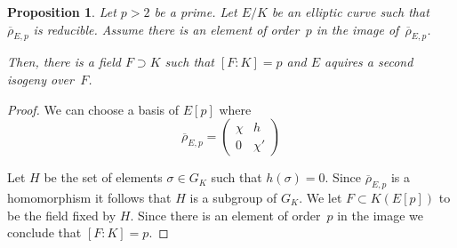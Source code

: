 \documentclass[12pt]{amsart}
\newcommand{\rhobar}{{\overline{\rho}}}
\numberwithin{equation}{section}
\newtheorem{proposition}[theorem]{Proposition}
\theoremstyle{definition}
\theoremstyle{remark}
\begin{document}
\begin{proposition} \label{P:fieldF}
Let $p > 2$ be a prime. Let $E/K$ be an elliptic curve such that 
$\rhobar_{E,p}$ is reducible. Assume there is an element of order~$p$ 
in the image of~$\rhobar_{E,p}$. 

Then, there is a field $F \supset K$ such that $[F : K] = p$ and $E$ aquires a 
second isogeny over~$F$.
\end{proposition}
\begin{proof} We can choose a basis of $E[p]$ where
\[
\rhobar_{E,p} =  \begin{pmatrix}
                            \chi& h \\
                            0 & \chi'
                            \end{pmatrix} \]

Let $H$ be the set of elements $\sigma \in  G_K$ such 
that $h(\sigma) = 0$. Since $\rhobar_{E,p}$ is a homomorphism it follows 
that $H$ is a subgroup of $G_K$. 
We let $F \subset K(E[p])$ to be the field fixed by $H$.
Since there is an element of order~$p$ in the image 
we conclude that $[F : K] =p$.
\end{proof}
\end{document}
